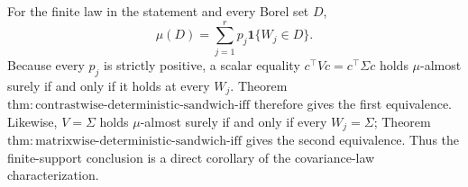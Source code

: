 For the finite law in the statement and every Borel set \(D\),
\[
 \mu(D)=\sum_{j=1}^rp_j\mathbf1\{W_j\in D\}.
\tag{1}
\]
Because every \(p_j\) is strictly positive, a scalar equality \(c^\top Vc=c^\top\Sigma c\) holds \(\mu\)-almost surely if and only if it holds at every \(W_j\). Theorem \(\mathrm{thm:contrastwise\text{-}deterministic\text{-}sandwich\text{-}iff}\) therefore gives the first equivalence. Likewise, \(V=\Sigma\) holds \(\mu\)-almost surely if and only if every \(W_j=\Sigma\); Theorem \(\mathrm{thm:matrixwise\text{-}deterministic\text{-}sandwich\text{-}iff}\) gives the second equivalence. Thus the finite-support conclusion is a direct corollary of the covariance-law characterization.
